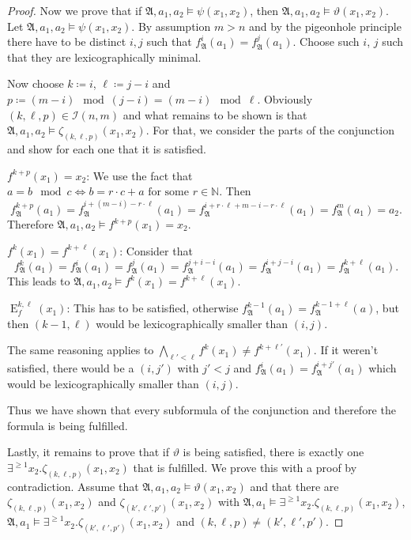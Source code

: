 \documentclass[a4paper,11pt,DIV=15]{scrartcl} %
\theoremstyle{plain}
\theoremstyle{definition}
\renewcommand{\theta}{\vartheta}
\begin{document}
\begin{proof}
	Now we prove that if $\mathfrak A,a_1,a_2 \models \psi(x_1,x_2)$, then $\mathfrak A,a_1,a_2 \models \theta(x_1,x_2)$. 
	Let $\mathfrak A,a_1,a_2\models \psi(x_1,x_2)$. By assumption $m>n$ and by the pigeonhole principle there have to be distinct $i, j$ such that $f_{\mathfrak A}^{i}(a_1)=f_{\mathfrak A}^{j}(a_1)$.
	Choose such $i$, $j$ such that they are lexicographically minimal.
	
	Now choose $k\coloneqq i$, $\ell \coloneqq j-i$ and $p\coloneqq (m-i) \mod (j-i)= (m-i) \mod \ell$.
	Obviously $(k,\ell,p)\in\mathcal I(n,m)$ and what remains to be shown is that $\mathfrak A,a_1,a_2\models \zeta_{(k,\ell,p)}(x_1,x_2)$.
	For that, we consider the parts of the conjunction and show for each one that it is satisfied.
	
	$f^{k+p}(x_1)=x_2$:
	We use the fact that $a= b \mod c \Leftrightarrow b = r\cdot c +a \text{ for some } r\in \mathbb N$.
	Then
	$$f_{\mathfrak A}^{k+p}(a_1)=f_{\mathfrak A}^{i+(m-i)-r\cdot \ell}(a_1)=f_{\mathfrak A}^{i+r\cdot \ell + m -i - r\cdot \ell}(a_1)=f_{\mathfrak A}^{m}(a_1)=a_2.$$
	Therefore $\mathfrak A,a_1,a_2\models f^{k+p}(x_1)=x_2$.
	
	$f^{k}(x_1)=f^{k+\ell}(x_1)$:
	Consider that
	$$f_{\mathfrak A}^{k}(a_1)=f_{\mathfrak A}^{i}(a_1)=f_{\mathfrak A}^{j}(a_1)=f_{\mathfrak A}^{j+i-i}(a_1)=f_{\mathfrak A}^{i+j-i}(a_1)=f_{\mathfrak A}^{k+\ell}(a_1).$$
	This leads to $\mathfrak A,a_1,a_2\models f^{k}(x_1)=f^{k+\ell}(x_1)$.
	
	$\operatorname{E}^{k,\ell}_f(x_1)$:
	This has to be satisfied, otherwise $f_{\mathfrak A}^{k-1}(a_1)=f_{\mathfrak A}^{k-1+\ell}(a)$, but then $(k-1,\ell)$ would be lexicographically smaller than $(i,j)$.
	
	The same reasoning applies to $\bigwedge_{\ell'<\ell}f^{k}(x_1)\neq f^{k+\ell'}(x_1)$. 
	If it weren't satisfied, there would be a $(i,j')$ with $j'<j$ and $f_{\mathfrak A}^{i}(a_1)=f_{\mathfrak A}^{i+j'}(a_1)$ which would be lexicographically smaller than $(i,j)$.
	
	Thus we have shown that every subformula of the conjunction and therefore the formula is being fulfilled.
	
	Lastly, it remains to prove that if $\theta$ is being satisfied, there is exactly one $\exists^{\geq 1}x_2.\zeta_{(k,\ell,p)}(x_1, x_2)$ that is fulfilled.
	We prove this with a proof by contradiction.
	Assume that $\mathfrak A,a_1,a_2\models \theta(x_1,x_2)$ and that there are $\zeta_{(k,\ell,p)}(x_1,x_2)$ and $\zeta_{(k',\ell',p')}(x_1,x_2)$ with $\mathfrak A,a_1\models \exists^{\geq 1}x_2.\zeta_{(k,\ell,p)}(x_1,x_2)$, $\mathfrak A,a_1\models \exists^{\geq 1}x_2.\zeta_{(k',\ell',p')}(x_1,x_2)$ and $(k,\ell,p)\neq (k',\ell',p')$.
	

\end{proof}
\end{document}
